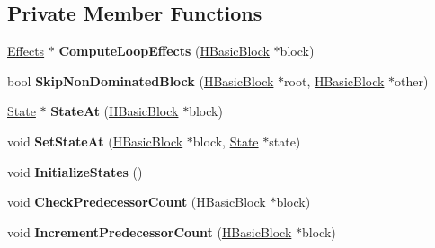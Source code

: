 \subsection*{Private Member Functions}
\begin{DoxyCompactItemize}
\item 
\hyperlink{classv8_1_1internal_1_1_effects}{Effects} $\ast$ {\bfseries Compute\+Loop\+Effects} (\hyperlink{classv8_1_1internal_1_1_h_basic_block}{H\+Basic\+Block} $\ast$block)\hypertarget{classv8_1_1internal_1_1_h_flow_engine_a823ec0aa26707864549dc03f87bda3cd}{}\label{classv8_1_1internal_1_1_h_flow_engine_a823ec0aa26707864549dc03f87bda3cd}

\item 
bool {\bfseries Skip\+Non\+Dominated\+Block} (\hyperlink{classv8_1_1internal_1_1_h_basic_block}{H\+Basic\+Block} $\ast$root, \hyperlink{classv8_1_1internal_1_1_h_basic_block}{H\+Basic\+Block} $\ast$other)\hypertarget{classv8_1_1internal_1_1_h_flow_engine_a931fab42198e5224fbaad747662155e5}{}\label{classv8_1_1internal_1_1_h_flow_engine_a931fab42198e5224fbaad747662155e5}

\item 
\hyperlink{classv8_1_1internal_1_1_state}{State} $\ast$ {\bfseries State\+At} (\hyperlink{classv8_1_1internal_1_1_h_basic_block}{H\+Basic\+Block} $\ast$block)\hypertarget{classv8_1_1internal_1_1_h_flow_engine_a5f91b903178a8bd6086482a5b23d89bb}{}\label{classv8_1_1internal_1_1_h_flow_engine_a5f91b903178a8bd6086482a5b23d89bb}

\item 
void {\bfseries Set\+State\+At} (\hyperlink{classv8_1_1internal_1_1_h_basic_block}{H\+Basic\+Block} $\ast$block, \hyperlink{classv8_1_1internal_1_1_state}{State} $\ast$state)\hypertarget{classv8_1_1internal_1_1_h_flow_engine_a6293a99ad056c59cc4aed57ef3157d49}{}\label{classv8_1_1internal_1_1_h_flow_engine_a6293a99ad056c59cc4aed57ef3157d49}

\item 
void {\bfseries Initialize\+States} ()\hypertarget{classv8_1_1internal_1_1_h_flow_engine_ab4cd4ef7c38baa39e50f6815ec938415}{}\label{classv8_1_1internal_1_1_h_flow_engine_ab4cd4ef7c38baa39e50f6815ec938415}

\item 
void {\bfseries Check\+Predecessor\+Count} (\hyperlink{classv8_1_1internal_1_1_h_basic_block}{H\+Basic\+Block} $\ast$block)\hypertarget{classv8_1_1internal_1_1_h_flow_engine_aca6297d6b0bfa990f8422d9003fd0002}{}\label{classv8_1_1internal_1_1_h_flow_engine_aca6297d6b0bfa990f8422d9003fd0002}

\item 
void {\bfseries Increment\+Predecessor\+Count} (\hyperlink{classv8_1_1internal_1_1_h_basic_block}{H\+Basic\+Block} $\ast$block)\hypertarget{classv8_1_1internal_1_1_h_flow_engine_af81e59b97e936464a13b64c1139f3f6e}{}\label{classv8_1_1internal_1_1_h_flow_engine_af81e59b97e936464a13b64c1139f3f6e}

\end{DoxyCompactItemize}
